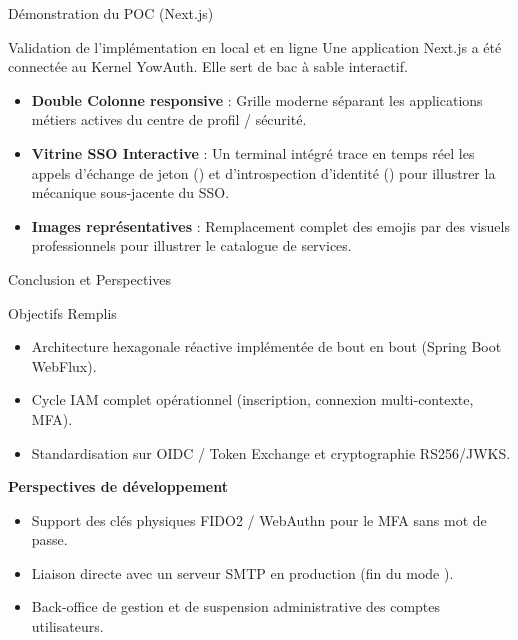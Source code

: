 \documentclass[10pt,aspectratio=169]{beamer}
\begin{document}
\begin{frame}{Démonstration du POC (Next.js)}
  \begin{block}{Validation de l'implémentation en local et en ligne}
    Une application Next.js a été connectée au Kernel YowAuth. Elle sert de bac à sable interactif.
  \end{block}
  \vspace{0.2cm}
  \begin{itemize}
    \item \textbf{Double Colonne responsive} : Grille moderne séparant les applications métiers actives du centre de profil / sécurité.
    \item \textbf{Vitrine SSO Interactive} : Un terminal intégré trace en temps réel les appels d'échange de jeton () et d'introspection d'identité () pour illustrer la mécanique sous-jacente du SSO.
    \item \textbf{Images représentatives} : Remplacement complet des emojis par des visuels professionnels pour illustrer le catalogue de services.
  \end{itemize}
\end{frame}

\begin{frame}{Conclusion et Perspectives}
  \begin{block}{Objectifs Remplis}
    \begin{itemize}
      \item Architecture hexagonale réactive implémentée de bout en bout (Spring Boot WebFlux).
      \item Cycle IAM complet opérationnel (inscription, connexion multi-contexte, MFA).
      \item Standardisation sur OIDC / Token Exchange et cryptographie RS256/JWKS.
    \end{itemize}
  \end{block}
  \vspace{0.2cm}
  \textbf{Perspectives de développement}
  \begin{itemize}
    \item Support des clés physiques FIDO2 / WebAuthn pour le MFA sans mot de passe.
    \item Liaison directe avec un serveur SMTP en production (fin du mode ).
    \item Back-office de gestion et de suspension administrative des comptes utilisateurs.
  \end{itemize}
\end{frame}
\end{document}
